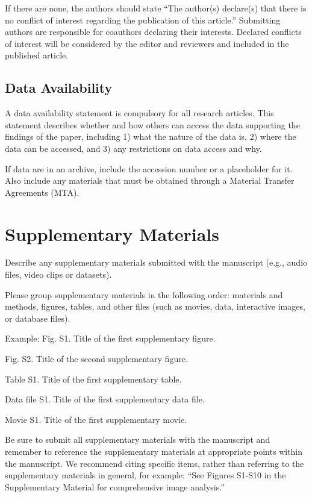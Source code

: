\documentclass{article}
\begin{document}
If there are none, the authors should state ``The author(s) declare(s) that there is no conflict of interest regarding the publication of this article.'' Submitting authors are responsible for coauthors declaring their interests. Declared conflicts of interest will be considered by the editor and reviewers and included in the published article.

\subsection{Data Availability}
A data availability statement is compulsory for all research articles. This statement describes whether and how others can access the data supporting the findings of the paper, including 1) what the nature of the data is, 2) where the data can be accessed, and 3) any restrictions on data access and why.

If data are in an archive, include the accession number or a placeholder for it. Also include any materials that must be obtained through a Material Transfer Agreements (MTA). 

\section*{Supplementary Materials}
Describe any supplementary materials submitted with the manuscript (e.g., audio files, video clips or datasets). 

Please group supplementary materials in the following order: materials and methods, figures, tables, and other files (such as movies, data, interactive images, or database files). 

\medskip Example:
Fig. S1. Title of the first supplementary figure.

Fig. S2. Title of the second supplementary figure.

Table S1. Title of the first supplementary table.

Data file S1. Title of the first supplementary data file.

Movie S1. Title of the first supplementary movie.

\medskip
Be sure to submit all supplementary materials with the manuscript and remember to reference the supplementary materials at appropriate points within the manuscript. We recommend citing specific items, rather than referring to the supplementary materials in general, for example: ``See Figures S1-S10 in the Supplementary Material for comprehensive image analysis.''
\end{document}
